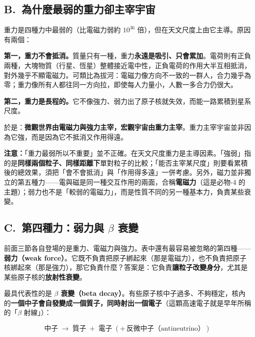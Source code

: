 \documentclass[11pt]{article}
\begin{document}
\subsection*{\sffamily B.\ 為什麼最弱的重力卻主宰宇宙}

重力是四種力中最弱的（比電磁力弱約 $10^{36}$ 倍），但在天文尺度上由它主導。原因有兩個：

\textbf{第一，重力不會抵消。}質量只有一種，重力\textbf{永遠是吸引、只會累加}。電荷則有正負兩種，大塊物質（行星、恆星）整體接近電中性，正負電荷的作用大半互相抵消，對外幾乎不顯電磁力。可類比為拔河：電磁力像方向不一致的一群人，合力幾乎為零；重力像所有人都往同一方向拉，即使每人力量小，人數一多合力仍很大。

\textbf{第二，重力是長程的。}它不像強力、弱力出了原子核就失效，而能一路累積到星系尺度。

於是：\textbf{微觀世界由電磁力與強力主宰，宏觀宇宙由重力主宰}。重力主宰宇宙並非因為它強，而是因為它不抵消又作用得遠。

\textbf{注意：}「重力最弱所以不重要」並不正確。在天文尺度重力是主導因素。「強弱」指的是\textbf{同樣兩個粒子、同樣距離下}單對粒子的比較；「能否主宰某尺度」則要看累積後的總效果，須把「會不會抵消」與「作用得多遠」一併考慮。另外，磁力並非獨立的第五種力——電與磁是同一種交互作用的兩面，合稱\textbf{電磁力}（這是必物-4 的主題）；弱力也不是「較弱的電磁力」，而是性質不同的另一種基本力，負責某些衰變。

\subsection*{\sffamily C.\ 第四種力：弱力與 $\beta$ 衰變}

前面三節各自登場的是重力、電磁力與強力。表中還有最容易被忽略的第四種——\textbf{弱力（weak force）}。它既不負責把原子綁起來（那是電磁力），也不負責把原子核綁起來（那是強力），那它負責什麼？答案是：它負責\textbf{讓粒子改變身分}，尤其是某些原子核的\textbf{放射性衰變}。

最具代表性的是 \textbf{$\beta$ 衰變（beta decay）}。有些原子核中子過多、不夠穩定，核內的\textbf{一個中子會自發變成一個質子，同時射出一個電子}（這顆高速電子就是早年所稱的「$\beta$ 射線」）：

$$\text{中子}\;\longrightarrow\;\text{質子}\;+\;\text{電子}\;(+\,\text{反微中子（antineutrino）})$$

\end{document}
